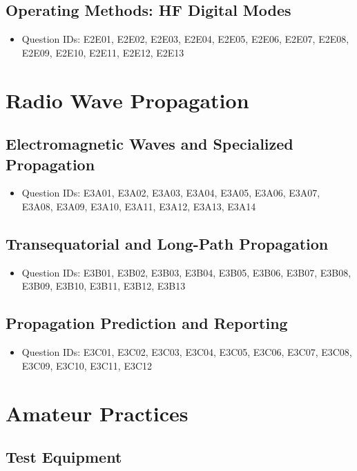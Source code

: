 \documentclass{book}
\begin{document}
\section{Operating Methods: HF Digital Modes}
\begin{itemize}
    \item Question IDs: E2E01, E2E02, E2E03, E2E04, E2E05, E2E06, E2E07, E2E08, E2E09, E2E10, E2E11, E2E12, E2E13
\end{itemize}

\chapter{Radio Wave Propagation}
\section{Electromagnetic Waves and Specialized Propagation}
\begin{itemize}
    \item Question IDs: E3A01, E3A02, E3A03, E3A04, E3A05, E3A06, E3A07, E3A08, E3A09, E3A10, E3A11, E3A12, E3A13, E3A14
\end{itemize}

\section{Transequatorial and Long-Path Propagation}
\begin{itemize}
    \item Question IDs: E3B01, E3B02, E3B03, E3B04, E3B05, E3B06, E3B07, E3B08, E3B09, E3B10, E3B11, E3B12, E3B13
\end{itemize}

\section{Propagation Prediction and Reporting}
\begin{itemize}
    \item Question IDs: E3C01, E3C02, E3C03, E3C04, E3C05, E3C06, E3C07, E3C08, E3C09, E3C10, E3C11, E3C12
\end{itemize}

\chapter{Amateur Practices}
\section{Test Equipment}
\end{document}
